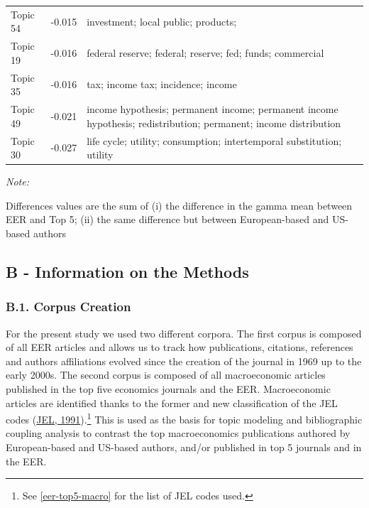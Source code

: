 \documentclass[]{elsarticle} %
\begin{document}
\begin{table}[!h]
\begin{threeparttable}
\begin{tabular}[t]{lrl}
\addlinespace
Topic 54 & -0.015 & investment; local public; products;
\cellcolor{gray!6}{local; property; public}\\
Topic 19 & -0.016 & federal reserve; federal; reserve; fed;
funds; commercial\\
Topic 35 & -0.016 & tax; income tax; incidence; income
\cellcolor{gray!6}{taxes; tax rate; corporate}\\
Topic 49 & -0.021 & income hypothesis; permanent
income; permanent income hypothesis;
redistribution; permanent; income
distribution\\
Topic 30 & -0.027 & life cycle; utility; consumption;
intertemporal substitution; utility
\cellcolor{gray!6}{function; life}\\
\bottomrule
\end{tabular}
\begin{tablenotes}
\item \textit{Note: } 
\item Differences values are the sum of (i) the difference in the gamma mean between EER and Top 5; (ii) the same difference but between European-based and US-based authors
\end{tablenotes}
\end{threeparttable}
\end{table}

\newpage

\hypertarget{appendix}{%
\subsection*{B - Information on the Methods}\label{appendix}}

\hypertarget{corpus}{%
\subsubsection*{B.1. Corpus Creation}\label{corpus}}

For the present study we used two different corpora. The first corpus is
composed of all EER articles and allows us to track how publications,
citations, references and authors affiliations evolved since the
creation of the journal in 1969 up to the early 2000s. The second corpus
is composed of all macroeconomic articles published in the top five
economics journals and the EER. Macroeconomic articles are identified
thanks to the former and new classification of the JEL codes
(\protect\hyperlink{ref-jel1991}{JEL, 1991}).\footnote{See
  \ref{eer-top5-macro} for the list of JEL codes used.} This is used as
the basis for topic modeling and bibliographic coupling analysis to
contrast the top macroeconomics publications authored by European-based
and US-based authors, and/or published in top 5 journals and in the EER.
\end{document}
